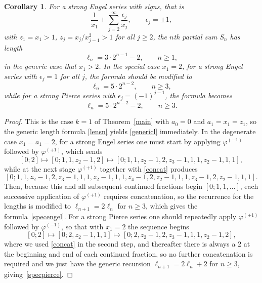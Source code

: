 \documentclass[12pt,a4paper]{amsart}
\newtheorem{corollary}[theorem]{Corollary}
\theoremstyle{definition}
\numberwithin{equation}{section}
\newcommand\eps{{\epsilon}}
\begin{document}
\begin{corollary}
\label{lencor} 
For a strong Engel series with signs, that is 
\begin{equation}
\label{sstreng} 
\frac{1}{x_1}+\sum_{j=2}^\infty \frac{\eps_j}{x_j}, \qquad \eps_j=\pm 1,
\end{equation} 
with $z_1=x_1>1$, $z_j = x_{j}/x_{j-1}^2>1$ for all $j\geq 2$, 
the $n$th partial sum $S_n$ has length 
\begin{equation}
\label{genericl} 
\ell_n = 3\cdot 2^{n-1} -2, \qquad n\geq 1,
\end{equation} 
in the generic case that $x_1>2$. In the special case $x_1=2$, for a strong Engel series with 
$\eps_j=1$ for all $j$,  
the formula should be modified to 
\begin{equation}
\label{specengel} 
\ell_n = 5\cdot 2^{n-2}, \qquad n\geq 3, 
\end{equation} 
while for a strong Pierce series with $\eps_j=(-1)^{j-1}$, the formula becomes 
\begin{equation}
\label{specpierce} 
\ell_n = 5\cdot 2^{n-2}-2, \qquad n\geq 3. 
\end{equation} 
\end{corollary} 

\begin{proof}
This is the case $k=1$ of Theorem~\ref{main} with $a_0=0$ and $a_1=x_1=z_1$, so the generic 
length formula \eqref{lensn} yields \eqref{genericl} immediately. In the degenerate case $x_1=a_1=2$, 
for a strong Engel series one must start by applying  
$\varphi^{(-1)}$ followed by 
$\varphi^{(+1)}$, which sends 
\[
[0; 2]\mapsto 
[0;1,1, z_2-1,2]\mapsto 
[0;1,1,z_2-1,2,z_3-1,1,1,z_2-1,1,1], 
\] 
while at the next stage $\varphi^{(+1)}$ together with \eqref{concat} produces 
\small 
\[
[0;1,1,z_2-1,2,z_3-1,1,1,z_2-1,1,1,z_4-1,2,z_2-1,1,1,z_3-1,2,z_2-1,1,1]. 
\] 
\normalsize
Then, because 
this and all subsequent continued fractions begin %
$[0;1,1,\ldots]$, each successive application of $\varphi^{(+1)}$
requires concatenation, so the recurrence for the lengths is modified to $\ell_{n+1} = 2\ell_n$ for $n\geq 3$, which  
gives the formula~\eqref{specengel}. For a strong Pierce series one should repeatedly apply 
$\varphi^{(+1)}$ followed by 
$\varphi^{(-1)}$, so that with $x_1=2$ the sequence begins 
\[
[0; 2]\mapsto 
[0;2, z_2-1,1,1]\mapsto 
[0;2,z_2-1,2,z_3-1,1,1,z_2-1,2], 
\] 
where we used \eqref{concat} in the second step, 
and thereafter there is always a $2$ at the beginning and end of each continued fraction, so 
no further concatenation is required and we just have the generic recursion 
$\ell_{n+1} = 2\ell_n +2$ for $n\geq 3$, giving~\eqref{specpierce}. 
\end{proof} 
\end{document}

